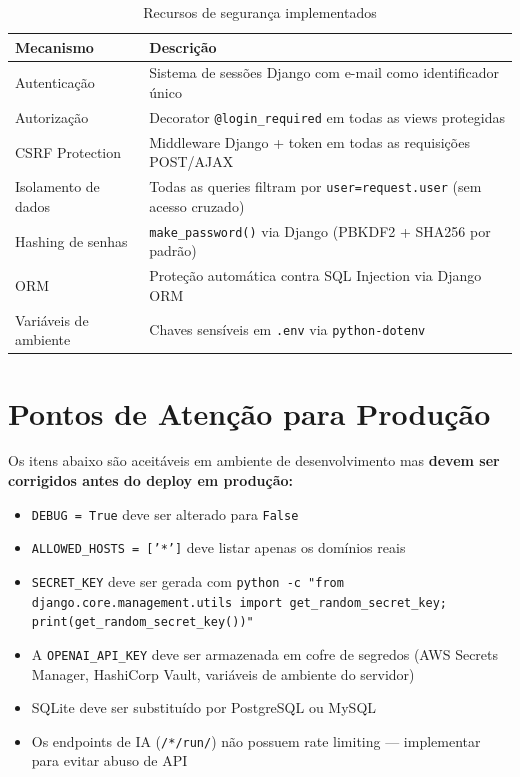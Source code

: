 \documentclass[12pt, a4paper, oneside]{report}
\begin{document}
\begin{table}[H]
\centering
\caption{Recursos de segurança implementados}
\begin{tabularx}{\textwidth}{l X}
\toprule
Mecanismo & Descrição \\
\midrule
Autenticação & Sistema de sessões Django com e-mail como identificador único \\
Autorização & Decorator \texttt{@login\_required} em todas as views protegidas \\
CSRF Protection & Middleware Django + token em todas as requisições POST/AJAX \\
Isolamento de dados & Todas as queries filtram por \texttt{user=request.user} (sem acesso cruzado) \\
Hashing de senhas & \texttt{make\_password()} via Django (PBKDF2 + SHA256 por padrão) \\
ORM & Proteção automática contra SQL Injection via Django ORM \\
Variáveis de ambiente & Chaves sensíveis em \texttt{.env} via \texttt{python-dotenv} \\
\bottomrule
\end{tabularx}
\end{table}

\section{Pontos de Atenção para Produção}

\begin{dangerbox}
Os itens abaixo são aceitáveis em ambiente de desenvolvimento mas \textbf{devem ser corrigidos antes do deploy em produção:}
\begin{itemize}
  \item \texttt{DEBUG = True} deve ser alterado para \texttt{False}
  \item \texttt{ALLOWED\_HOSTS = ['*']} deve listar apenas os domínios reais
  \item \texttt{SECRET\_KEY} deve ser gerada com \texttt{python -c "from django.core.management.utils import get\_random\_secret\_key; print(get\_random\_secret\_key())"}
  \item A \texttt{OPENAI\_API\_KEY} deve ser armazenada em cofre de segredos (AWS Secrets Manager, HashiCorp Vault, variáveis de ambiente do servidor)
  \item SQLite deve ser substituído por PostgreSQL ou MySQL
  \item Os endpoints de IA (\texttt{/*/run/}) não possuem rate limiting — implementar para evitar abuso de API
\end{itemize}
\end{dangerbox}
\end{document}
